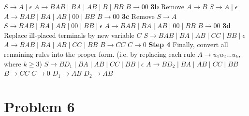 \documentclass[11pt]{article}
\begin{document}
$S \rightarrow A \mid \epsilon$
\newline
$A \rightarrow BAB \mid BA \mid AB \mid B \mid BB$
\newline
$B \rightarrow 00$
\newline
\newline
\textbf{3b} Remove $A \rightarrow B$
\newline
\newline
$S \rightarrow A \mid \epsilon$
\newline
$A \rightarrow BAB \mid BA \mid AB \mid 00 \mid BB$
\newline
$B \rightarrow 00$
\newline
\newline
\textbf{3c} Remove $S \rightarrow A$
\newline
\newline
$S \rightarrow BAB \mid BA \mid AB \mid 00 \mid BB \mid \epsilon$
\newline
$A \rightarrow BAB \mid BA \mid AB \mid 00 \mid BB$
\newline
$B \rightarrow 00$
\newline
\newline
\textbf{3d} Replace ill-placed terminals by new variable $C$
\newline
\newline
$S \rightarrow BAB \mid BA \mid AB \mid CC \mid BB \mid \epsilon$
\newline
$A \rightarrow BAB \mid BA \mid AB \mid CC \mid BB$
\newline
$B \rightarrow CC$
\newline
$C \rightarrow 0$
\newline
\newline
\textbf{Step 4} Finally, convert all remaining rules into the proper form. (i.e. by replacing each rule $A \rightarrow u_{1}u_{2} \dots u_{k}$, where $k \geq 3$)
\newline
\newline
$S \rightarrow BD_{1} \mid BA \mid AB \mid CC \mid BB \mid \epsilon$
\newline
$A \rightarrow BD_{2} \mid BA \mid AB \mid CC \mid BB$
\newline
$B \rightarrow CC$
\newline
$C \rightarrow 0$
\newline
$D_{1} \rightarrow AB$
\newline
$D_{2} \rightarrow AB$
\newpage
\section*{Problem 6}
\end{document}
